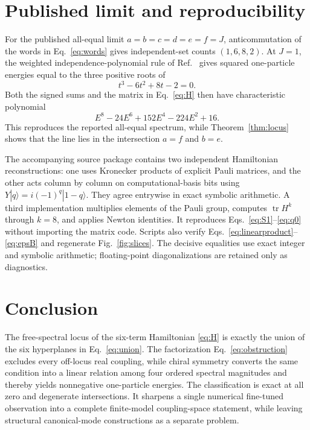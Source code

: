 \documentclass[
  aps,
  pra,
  reprint,
  superscriptaddress,
  nofootinbib,
  longbibliography
]{revtex4-2}
\begin{document}
\section{Published limit and reproducibility}
\label{sec:reproducibility}

For the published all-equal limit \(a=b=c=d=e=f=J\), anticommutation of the words in
Eq.~\eqref{eq:words} gives independent-set counts \((1,6,8,2)\).  At \(J=1\), the
weighted independence-polynomial rule of Ref.~\cite{Elman2021} gives squared
one-particle energies equal to the three positive roots of
\begin{equation}
 t^3-6t^2+8t-2=0.
 \label{eq:baselinecubic}
\end{equation}
Both the signed sums and the matrix in Eq.~\eqref{eq:H} then have characteristic
polynomial
\begin{equation}
 E^8-24E^6+152E^4-224E^2+16.
 \label{eq:baselinepoly}
\end{equation}
This reproduces the reported all-equal spectrum, while Theorem~\ref{thm:locus} shows
that the line lies in the intersection \(a=f\) and \(b=e\).

The accompanying source package contains two independent Hamiltonian reconstructions:
one uses Kronecker products of explicit Pauli matrices, and the other acts column by
column on computational-basis bits using
\(Y|q\rangle=i(-1)^q|1-q\rangle\).  They agree entrywise in exact symbolic arithmetic.
A third implementation multiplies elements of the Pauli group, computes
\(\operatorname{tr}H^k\) through \(k=8\), and applies Newton identities.  It reproduces
Eqs.~\eqref{eq:S1}--\eqref{eq:q0} without importing the matrix code.  Scripts also
verify Eqs.~\eqref{eq:linearproduct}--\eqref{eq:epsB} and regenerate
Fig.~\ref{fig:slices}.  The decisive equalities use exact integer and symbolic
arithmetic; floating-point diagonalizations are retained only as diagnostics.

\section{Conclusion}

The free-spectral locus of the six-term Hamiltonian \eqref{eq:H} is exactly the union
of the six hyperplanes in Eq.~\eqref{eq:union}.  The factorization
Eq.~\eqref{eq:obstruction} excludes every off-locus real coupling, while chiral
symmetry converts the same condition into a linear relation among four ordered
spectral magnitudes and thereby yields nonnegative one-particle energies.  The
classification is exact at all zero and degenerate intersections.  It sharpens a
single numerical fine-tuned observation into a complete finite-model coupling-space
statement, while leaving structural canonical-mode constructions as a separate
problem.
\end{document}
